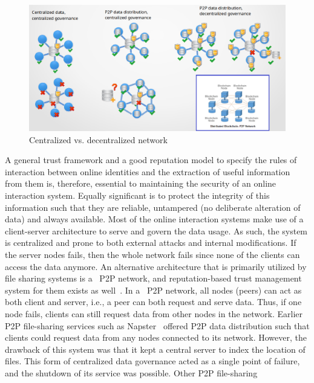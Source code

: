 \begin{figure}[H]
	\begin{center}
		\includegraphics[width=1.0\textwidth]{Images/WhyBlockchain.eps}
		\caption{Centralized vs. decentralized network}
		\label{fig:WhyBlockchain}
	\end{center}
\end{figure}
\vspace{-8mm}
A general trust framework and a good reputation model to specify the rules of
interaction between online identities and the extraction of useful information
from them is, therefore, essential to maintaining the security of an online
interaction system. Equally significant is to protect the integrity of this
information such that they are reliable, untampered (no deliberate alteration
of data) and always available. Most of the online interaction systems make use
of a client-server architecture to serve and govern the data usage. As such,
the system is centralized and prone to both external attacks and internal
modifications. If the server nodes fails, then the whole network fails since
none of the clients can access the data anymore. An alternative architecture
that is primarily utilized by file sharing systems is a ~\ac{P2P} network, and
reputation-based trust management system for them exists as
well~\cite{selcuk2004reputation}. In a ~\ac{P2P} network, all nodes (peers) can
act as both client and server, i.e., a peer can both request and serve data.
Thus, if one node fails, clients can still request data from other nodes in the
network. Earlier P2P file-sharing services such as
Napster~\cite{stern2000napster} offered P2P data distribution such that clients
could request data from any nodes connected to its network. However, the
drawback of this system was that it kept a central server to index the location
of files. This form of centralized data governance acted as a single point of
failure, and the shutdown of its service was possible. Other P2P file-sharing
